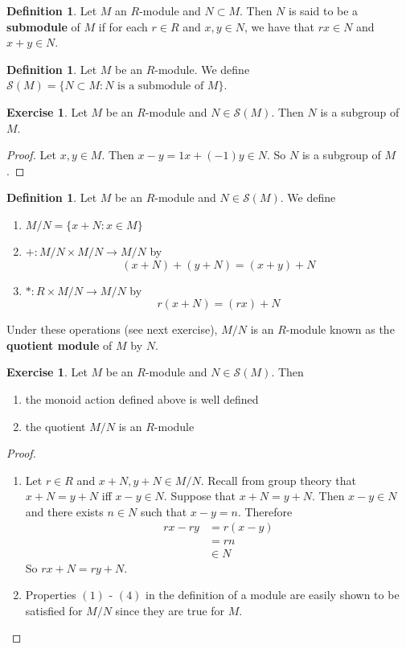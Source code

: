 \documentclass[12pt]{amsart}
\theoremstyle{definition}
\newtheorem{defn}[definition]{Definition}
\theoremstyle{remark}
\theoremstyle{definition}
\newtheorem{ex}[definition]{Exercise}
\newcommand{\MS}{\mathcal{S}}
\begin{document}
	\begin{defn}
	Let $M$ an $R$-module and $N \subset M$. Then $N$ is said to be a \textbf{submodule} of $M$ if for each $r \in R$ and $x,y \in N$, we have that $rx \in N$ and $x+y \in N$.
	\end{defn}
	
	\begin{defn}
	Let $M$ be an $R$-module. We define $\MS(M) = \{N \subset M: N \text{ is a submodule of }M\}$.
	\end{defn}	
	
	\begin{ex}
	Let $M$ be an $R$-module and $N \in \MS(M)$. Then $N$ is a subgroup of $M$.
	\end{ex}
	
	\begin{proof}
	Let $x,y \in M$. Then $x-y = 1x + (-1)y \in N$. So $N$ is a subgroup of $M$.
	\end{proof}
	
	\begin{defn}
	Let $M$ be an $R$-module and $N \in \MS(M)$. We define  
	\begin{enumerate}
	\item $M/N = \{x + N: x \in M\}$ 
	\item $+: M/N \times M/N \rightarrow M/N$ by $$(x+N) + (y+N) = (x+y) + N$$
	\item $*: R \times M/N \rightarrow M/N$ by $$r(x+N) = (rx) + N$$
	\end{enumerate}
	Under these operations (see next exercise), $M/N$ is an $R$-module known as the \textbf{quotient module} of $M$ by $N$.
	\end{defn}	
	
	\begin{ex} 
	Let $M$ be an $R$-module and $N \in \MS(M)$. Then
	\begin{enumerate}
	\item the monoid action defined above is well defined
	\item the quotient $M/N$ is an $R$-module
	\end{enumerate}
	\end{ex}
	
	\begin{proof}\
	\begin{enumerate}
	\item Let $r \in R$ and $x +N, y +N \in M/N $. Recall from group theory that $x + N = y + N$ iff $x-y \in N$. Suppose that $x + N = y + N$. Then $x - y \in N$ and there exists $n \in N$ such that $x-y = n$. Therefore
	\begin{align*}
	rx - ry 
	&= r(x-y) \\
	&= rn \\
	&\in N
	\end{align*}
	So $rx + N = ry + N$.
	\item Properties $(1)$ - $(4)$ in the definition of a module are easily shown to be satisfied for $M/N$ since they are true for $M$.
	\end{enumerate}
	\end{proof}
	
\end{document}
